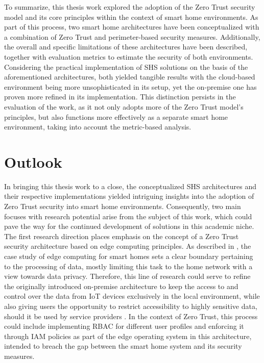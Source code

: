 To summarize, this thesis work explored the adoption of the Zero Trust security model and its core principles within the context of smart home environments. As part of this process, two smart home architectures have been conceptualized with a combination of Zero Trust and perimeter-based security measures. Additionally, the overall and specific limitations of these architectures have been described, together with evaluation metrics to estimate the security of both environments. Considering the practical implementation of SHS solutions on the basis of the aforementioned architectures, both yielded tangible results with the cloud-based environment being more unsophisticated in its setup, yet the on-premise one has proven more refined in its implementation. This distinction persists in the evaluation of the work, as it not only adopts more of the Zero Trust model's principles, but also functions more effectively as a separate smart home environment, taking into account the metric-based analysis. 

\section{Outlook}
In bringing this thesis work to a close, the conceptualized SHS architectures and their respective implementations yielded intriguing insights into the adoption of Zero Trust security into smart home environments. Consequently, two main focuses with research potential arise from the subject of this work, which could pave the way for the continued development of solutions in this academic niche.\\

The first research direction places emphasis on the concept of a Zero Trust security architecture based on edge computing principles. As described in \cite{edge_comp}, the case study of edge computing for smart homes sets a clear boundary pertaining to the processing of data, mostly limiting this task to the home network with a view towards data privacy. Therefore, this line of research could serve to refine the originally introduced on-premise architecture to keep the access to and control over the data from IoT devices exclusively in the local environment, while also giving users the opportunity to restrict accessibility to highly sensitive data, should it be used by service providers \cite{edge_comp}. In the context of Zero Trust, this process could include implementing RBAC for different user profiles and enforcing it through IAM policies as part of the edge operating system in this architecture, intended to breach the gap between the smart home system and its security measures.\\

